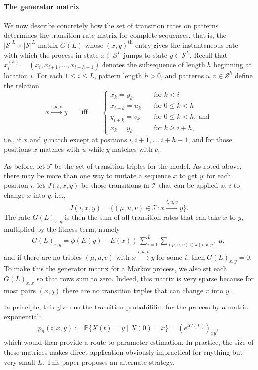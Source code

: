 \documentclass{article}
\renewcommand{\P}{\mathbb{P}}
\newcommand{\calS}{\mathcal{S}}  %
\newcommand{\calT}{\mathcal{T}}  %
\newcommand{\st}{\colon}  %
\theoremstyle{plain}
\theoremstyle{definition}
\begin{document}
\paragraph{The generator matrix}
We now describe concretely how the set of transition rates on patterns determines the transition rate matrix for complete sequences, that is,
the $|\calS|^L \times |\calS|^L$ matrix $G(L)$ whose $(x,y)^\text{th}$ entry gives the instantaneous rate
with which the process in state $x \in \calS^L$ jumps to state $y \in \calS^L$.
Recall that $x_i^{(h)} = (x_i, x_{i+1}, \ldots, x_{i+h-1})$ denotes the subsequence of length $h$ beginning at location $i$.
For each $1\le i \le L$, pattern length $h > 0$, and patterns $u,v \in \calS^h$ define the relation
\[
x \xrightarrow{i,u,v} y \qquad \text{iff} \qquad \begin{cases}
  x_k = y_k \quad &\text{for } k<i \\
  x_{i+k} = u_k \quad &\text{for } 0 \le k < h \\
  y_{i+k} = v_k \quad &\text{for } 0 \le k < h,\ \text{and} \\
  x_k = y_k \quad &\text{for } k\ge i+h ,
\end{cases}
\]
i.e., if $x$ and $y$ match except at positions $i,i+1,\ldots,i+h-1$,
and for those positions $x$ matches with $u$ while $y$ matches with $v$.

As before, let $\calT$ be the set of transition triples for the model.
As noted above, there may be more than one way to mutate a sequence $x$ to get $y$:
for each position $i$, let $J(i,x,y)$ be those transitions in $\calT$ that can be applied at $i$
to change $x$ into $y$, i.e.,
\[
    J(i,x,y) = \{ (\mu,u,v) \in \calT \st x \xrightarrow{i,u,v} y \}.
\]
The rate ${G(L)}_{x,y}$ is then the sum of all transition rates that can take $x$ to $y$,
multiplied by the fitness term,
namely
\begin{align} \label{eqn:G_defn}
    {G(L)}_{x,y} = \phi\left(E(y)-E(x)\right) \, \sum_{i=1}^L \sum_{(\mu, u, v) \in J(i,x,y)}  \mu ,
\end{align}
and if there are no triples $(\mu,u,v)$ with $x \xrightarrow{i,u,v} y$ for some $i$, then ${G(L)}_{x,y}=0$.
To make this the generator matrix for a Markov process,
we also set each $G(L)_{x,x}$ so that rows sum to zero.
Indeed, this matrix is very sparse because for most pairs $(x,y)$ there are no transition triples that can change $x$ into $y$.

In principle, this gives us the transition probabilities for the process by a matrix exponential:
\begin{align} \label{eqn:full_likelihood}
    p_n(t;x,y) := \P\{ X(t) = y \mid X(0) = x \} = {\left(e^{tG(L)}\right)}_{xy} ,
\end{align}
which would then provide a route to parameter estimation.
In practice, the size of these matrices makes direct application obviously impractical for anything but very small $L$.
This paper proposes an alternate strategy.
\end{document}
